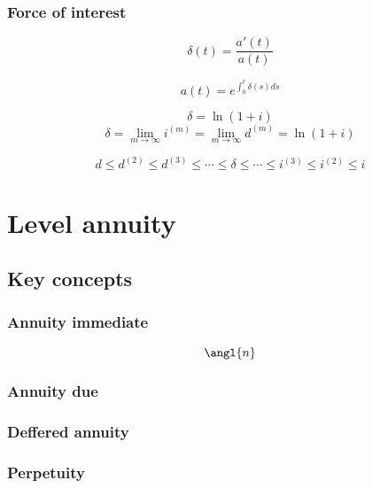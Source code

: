 \documentclass[
]{book}
\begin{document}
\hypertarget{force-of-interest}{%
\subsection*{Force of interest}\label{force-of-interest}}

\[\delta(t)=\frac{a'(t)}{a(t)}\]

\[a(t)=e^{\int_0^t\delta(s)ds}\]

\[\delta=\ln(1+i)\]
\[\delta=\lim_{m\rightarrow\infty} i^{(m)}=\lim_{m\rightarrow\infty} d^{(m)}=\ln(1+i)\]

\[d\le d^{(2)}\le d^{(3)}\le\cdots\le \delta\le\cdots\le i^{(3)}\le i^{(2)}\le i\]

\hypertarget{level-annuity}{%
\chapter{Level annuity}\label{level-annuity}}

\hypertarget{key-concepts}{%
\section{Key concepts}\label{key-concepts}}

\hypertarget{annuity-immediate}{%
\subsection*{Annuity immediate}\label{annuity-immediate}}

\[\angl{n}\]

\hypertarget{annuity-due}{%
\subsection*{Annuity due}\label{annuity-due}}

\hypertarget{deffered-annuity}{%
\subsection*{Deffered annuity}\label{deffered-annuity}}

\hypertarget{perpetuity}{%
\subsection*{Perpetuity}\label{perpetuity}}
\end{document}
